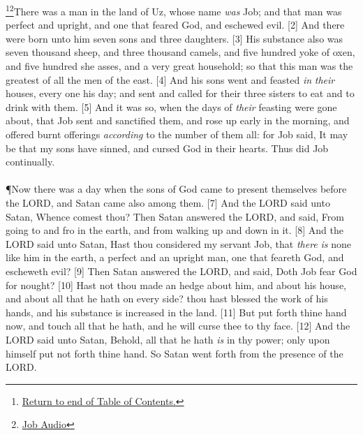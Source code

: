 \footnote{\textcolor[cmyk]{0.99998,1,0,0}{\hyperlink{TOC}{Return to end of Table of Contents.}}}\footnote{\href{https://www.audioverse.org/english/audiobibles/books/ENGKJV/O/Job/1}{\textcolor[cmyk]{0.99998,1,0,0}{Job  Audio}}}\textcolor[cmyk]{0.99998,1,0,0}{There was a man in the land of Uz, whose name \emph{was} Job; and that man was perfect and upright, and one that feared God, and eschewed evil.}
[2] \textcolor[cmyk]{0.99998,1,0,0}{And there were born unto him seven sons and three daughters.}
[3] \textcolor[cmyk]{0.99998,1,0,0}{His substance also was seven thousand sheep, and three thousand camels, and five hundred yoke of oxen, and five hundred she asses, and a very great household; so that this man was the greatest of all the men of the east.}
[4] \textcolor[cmyk]{0.99998,1,0,0}{And his sons went and feasted \emph{in} \emph{their} houses, every one his day; and sent and called for their three sisters to eat and to drink with them.}
[5] \textcolor[cmyk]{0.99998,1,0,0}{And it was so, when the days of \emph{their} feasting were gone about, that Job sent and sanctified them, and rose up early in the morning, and offered burnt offerings \emph{according} to the number of them all: for Job said, It may be that my sons have sinned, and cursed God in their hearts. Thus did Job continually.}\\
\\
\P \textcolor[cmyk]{0.99998,1,0,0}{Now there was a day when the sons of God came to present themselves before the LORD, and Satan came also among them.}
[7] \textcolor[cmyk]{0.99998,1,0,0}{And the LORD said unto Satan, Whence comest thou? Then Satan answered the LORD, and said, From going to and fro in the earth, and from walking up and down in it.}
[8] \textcolor[cmyk]{0.99998,1,0,0}{And the LORD said unto Satan, Hast thou considered my servant Job, that \emph{there} \emph{is} none like him in the earth, a perfect and an upright man, one that feareth God, and escheweth evil?}
[9] \textcolor[cmyk]{0.99998,1,0,0}{Then Satan answered the LORD, and said, Doth Job fear God for nought?}
[10] \textcolor[cmyk]{0.99998,1,0,0}{Hast not thou made an hedge about him, and about his house, and about all that he hath on every side? thou hast blessed the work of his hands, and his substance is increased in the land.}
[11] \textcolor[cmyk]{0.99998,1,0,0}{But put forth thine hand now, and touch all that he hath, and he will curse thee to thy face.}
[12] \textcolor[cmyk]{0.99998,1,0,0}{And the LORD said unto Satan, Behold, all that he hath \emph{is} in thy power; only upon himself put not forth thine hand. So Satan went forth from the presence of the LORD.}\\
